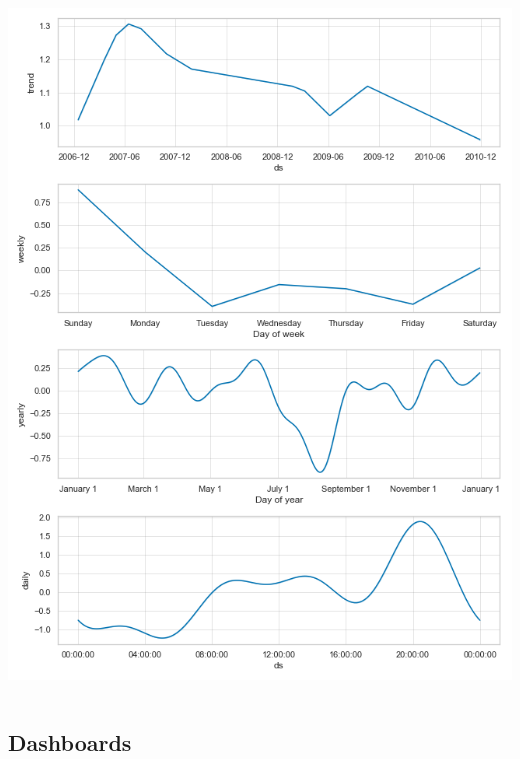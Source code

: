 \documentclass[10pt]{beamer}
\begin{document}
\begin{frame}
\begin{columns}[c]
{
    \centering
    \includegraphics[width=\textwidth,height=\textheight,keepaspectratio]{prophet_components.png}
    \par
}

\end{columns}

\end{frame}

\subsection{Dashboards}
\end{document}
